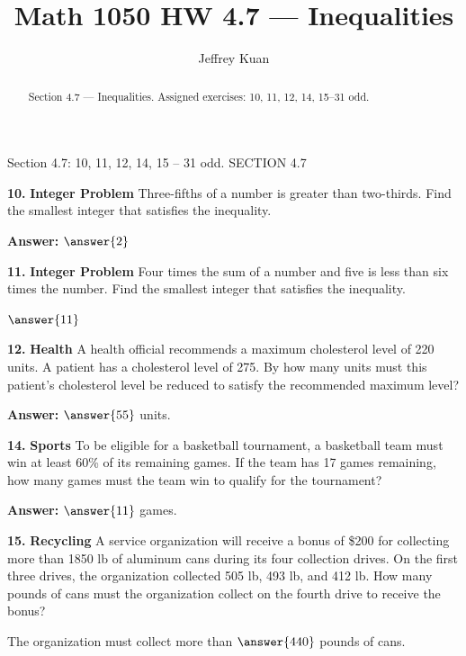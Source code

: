 \documentclass{ximera}
\author{Jeffrey Kuan}
\title{Math 1050 HW 4.7 --- Inequalities}
\begin{document}
\begin{abstract}
    Section 4.7 --- Inequalities.
    Assigned exercises: 10, 11, 12, 14, 15–31 odd.
\end{abstract}

\maketitle

Section 4.7: 10, 11, 12, 14, 15 – 31 odd. SECTION 4.7

\begin{problem}
\textbf{10.} \textbf{Integer Problem} Three-fifths of a number is greater than two-thirds. Find
  the smallest integer that satisfies the inequality.

\textbf{Answer:} $\answer{2} $
\end{problem}

\begin{problem}
\textbf{11.} \textbf{Integer Problem} Four times the sum of a number and five is less than six
  times the number. Find the smallest integer that satisfies the inequality.

$ \answer{11} $
\end{problem}

\begin{problem}
\textbf{12.} \textbf{Health} A health official recommends a maximum cholesterol level of 220
  units. A patient has a cholesterol level of 275. By how many units must this patient's
  cholesterol level be reduced to satisfy the recommended maximum level?

\textbf{Answer:} $\answer{55}$ units.
\end{problem}

\begin{problem}
\textbf{14.} \textbf{Sports} To be eligible for a basketball tournament, a basketball team must
  win at least 60\% of its remaining games. If the team has 17 games remaining, how many
  games must the team win to qualify for the tournament?

\textbf{Answer:} $\answer{11}$ games.
\end{problem}

\begin{problem}
\textbf{15.} \textbf{Recycling} A service organization will receive a bonus of \$200 for
  collecting more than 1850 lb of aluminum cans during its four collection drives. On the
  first three drives, the organization collected 505 lb, 493 lb, and 412 lb. How many
  pounds of cans must the organization collect on the fourth drive to receive the bonus?

The organization must collect more than \( \answer{440} \) pounds of cans.
\end{problem}
\end{document}
